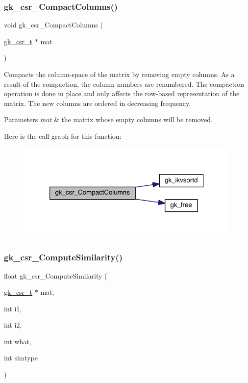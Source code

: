 \subsubsection{\texorpdfstring{gk\+\_\+csr\+\_\+\+Compact\+Columns()}{gk\_csr\_CompactColumns()}}
{\footnotesize\ttfamily void gk\+\_\+csr\+\_\+\+Compact\+Columns (\begin{DoxyParamCaption}\item[{\hyperlink{a00634}{gk\+\_\+csr\+\_\+t} $\ast$}]{mat }\end{DoxyParamCaption})}

Compacts the column-\/space of the matrix by removing empty columns. As a result of the compaction, the column numbers are renumbered. The compaction operation is done in place and only affects the row-\/based representation of the matrix. The new columns are ordered in decreasing frequency.


\begin{DoxyParams}{Parameters}
{\em mat} & the matrix whose empty columns will be removed. \\
\hline
\end{DoxyParams}
Here is the call graph for this function\+:\nopagebreak
\begin{figure}[H]
\begin{center}
\leavevmode
\includegraphics[width=316pt]{a00023_a3e15963be76870160707368a5fe7f693_cgraph}
\end{center}
\end{figure}
\mbox{\label{a00023_a86d96bf7b4f265b0e4a3b244ba031b0d}} 
\subsubsection{\texorpdfstring{gk\+\_\+csr\+\_\+\+Compute\+Similarity()}{gk\_csr\_ComputeSimilarity()}}
{\footnotesize\ttfamily float gk\+\_\+csr\+\_\+\+Compute\+Similarity (\begin{DoxyParamCaption}\item[{\hyperlink{a00634}{gk\+\_\+csr\+\_\+t} $\ast$}]{mat,  }\item[{int}]{i1,  }\item[{int}]{i2,  }\item[{int}]{what,  }\item[{int}]{simtype }\end{DoxyParamCaption})}

